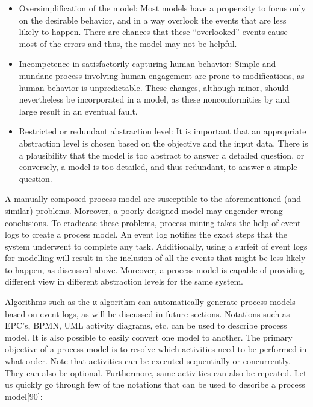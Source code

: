 \begin{itemize}
	\item Oversimplification of the model: Most models have a propensity to focus only on the desirable behavior, and in a way overlook the events that are less likely to happen. There are chances that these “overlooked” events cause most of the errors and thus, the model may not be helpful.
	\item Incompetence in satisfactorily capturing human behavior: Simple and mundane process involving human engagement are prone to modifications, as human behavior is unpredictable. These changes, although minor, should nevertheless be incorporated in a model, as these nonconformities by and large result in an eventual fault.
	\item Restricted or redundant abstraction level: It is important that an appropriate abstraction level is chosen based on the objective and the input data. There is a plausibility that the model is too abstract to answer a detailed question, or conversely, a model is too detailed, and thus redundant, to answer a simple question.
\end{itemize}

A manually composed process model are susceptible to the aforementioned (and similar) problems. Moreover, a poorly designed model may engender wrong conclusions. To eradicate these problems, process mining takes the help of event logs to create a process model. An event log notifies the exact steps that the system underwent to complete any task. Additionally, using a surfeit of event logs for modelling will result in the inclusion of all the events that might be less likely to happen, as discussed above. Moreover, a process model is capable of providing different view in different abstraction levels for the same system.

Algorithms such as the α-algorithm can automatically generate process models based on event logs, as will be discussed in future sections. Notations such as EPC’s, BPMN, UML activity diagrams, etc. can be used to describe process model. It is also possible to easily convert one model to another. The primary objective of a process model is to resolve which activities need to be performed in what order. Note that activities can be executed sequentially or concurrently. They can also be optional. Furthermore, same activities can also be repeated. Let us quickly go through few of the notations that can be used to describe a process model[90]: 

